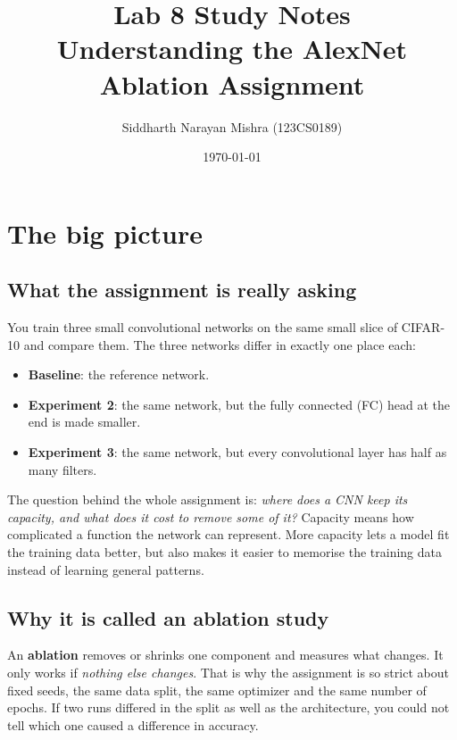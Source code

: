 \documentclass[11pt]{article}
\title{Lab 8 Study Notes\\ \large Understanding the AlexNet Ablation Assignment}
\author{Siddharth Narayan Mishra (123CS0189)}
\date{\today}
\newcommand{\key}[1]{\textbf{#1}}
\begin{document}
\maketitle
\tableofcontents
\newpage

\section{The big picture}

\subsection{What the assignment is really asking}

You train three small convolutional networks on the same small slice of CIFAR-10 and compare them. The three networks differ in exactly one place each:

\begin{itemize}[noitemsep]
\item \key{Baseline}: the reference network.
\item \key{Experiment 2}: the same network, but the fully connected (FC) head at the end is made smaller.
\item \key{Experiment 3}: the same network, but every convolutional layer has half as many filters.
\end{itemize}

The question behind the whole assignment is: \emph{where does a CNN keep its capacity, and what does it cost to remove some of it?} Capacity means how complicated a function the network can represent. More capacity lets a model fit the training data better, but also makes it easier to memorise the training data instead of learning general patterns.

\subsection{Why it is called an ablation study}

An \key{ablation} removes or shrinks one component and measures what changes. It only works if \emph{nothing else changes}. That is why the assignment is so strict about fixed seeds, the same data split, the same optimizer and the same number of epochs. If two runs differed in the split as well as the architecture, you could not tell which one caused a difference in accuracy.
\end{document}
